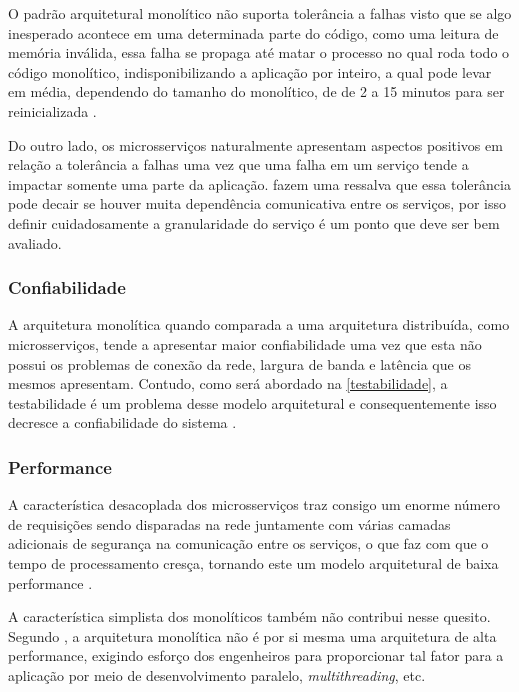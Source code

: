 O padrão arquitetural monolítico não suporta tolerância a falhas visto que se algo inesperado
acontece em uma determinada parte do código, como uma leitura de memória inválida, essa falha se
propaga até matar o processo no qual roda todo o código monolítico, indisponibilizando a
aplicação por inteiro, a qual pode levar em média, dependendo do tamanho do monolítico, de de 2 a
15 minutos para ser reinicializada \cite{Richards2020:FundamentalsOfSoftwareArchitecture}.

Do outro lado, os microsserviços naturalmente apresentam aspectos positivos em relação a tolerância
a falhas uma vez que uma falha em um serviço tende a impactar somente uma parte da aplicação.
 fazem uma ressalva que essa tolerância pode
decair se houver muita dependência comunicativa entre os serviços, por isso definir cuidadosamente a
granularidade do serviço é um ponto que deve ser bem avaliado.

\subsubsection{Confiabilidade}
\label{pers:confiabilidade}

A arquitetura monolítica quando comparada a uma arquitetura distribuída, como microsserviços, tende
a apresentar maior confiabilidade uma vez que esta não possui os problemas de conexão da rede,
largura de banda e latência que os mesmos apresentam. Contudo, como será abordado na
\autoref{testabilidade}, a testabilidade é um problema desse modelo arquitetural e consequentemente
isso decresce a confiabilidade do sistema \cite{Richards2020:FundamentalsOfSoftwareArchitecture}.

\subsubsection{Performance}
\label{pers:performance}

A característica desacoplada dos microsserviços traz consigo um enorme número de requisições
sendo disparadas na rede juntamente com várias camadas adicionais de segurança na comunicação entre
os serviços, o que faz com que o tempo de processamento cresça, tornando este um modelo arquitetural
de baixa performance \cite{Richards2020:FundamentalsOfSoftwareArchitecture}.

A característica simplista dos monolíticos também não contribui nesse quesito. Segundo
, a arquitetura monolítica não é por si
mesma uma arquitetura de alta performance, exigindo esforço dos engenheiros para proporcionar
tal fator para a aplicação por meio de desenvolvimento paralelo, \textit{multithreading}, etc.


